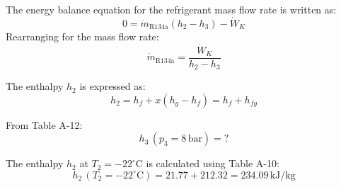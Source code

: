 The energy balance equation for the refrigerant mass flow rate is written as:  
\[
0 = \dot{m}_{\text{R134a}} \left( h_2 - h_3 \right) - \dot{W}_K
\]  
Rearranging for the mass flow rate:  
\[
\dot{m}_{\text{R134a}} = \frac{\dot{W}_K}{h_2 - h_3}
\]  

The enthalpy \(h_2\) is expressed as:  
\[
h_2 = h_f + x \left( h_g - h_f \right) = h_f + h_{fg}
\]  

From Table A-12:  
\[
h_3 \, (p_3 = 8 \, \text{bar}) = ?
\]  

The enthalpy \(h_2\) at \(T_2 = -22^\circ\text{C}\) is calculated using Table A-10:  
\[
h_2 \, (T_2 = -22^\circ\text{C}) = 21.77 + 212.32 = 234.09 \, \text{kJ/kg}
\]